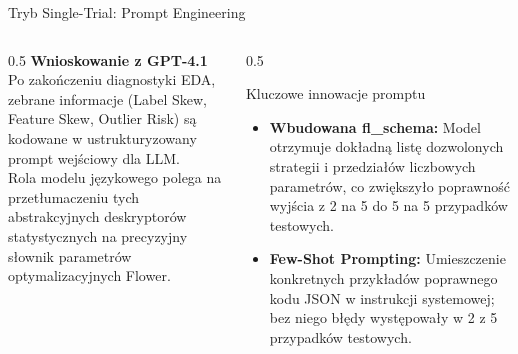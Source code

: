 \documentclass[9pt,aspectratio=169]{beamer}
\begin{document}
\begin{frame}{Tryb Single-Trial: Prompt Engineering}
\begin{columns}[T]
\begin{column}{0.5\textwidth}
\textbf{Wnioskowanie z GPT-4.1}\\[4pt]
Po zakończeniu diagnostyki EDA, zebrane informacje (Label Skew, Feature Skew, Outlier Risk) są kodowane w ustrukturyzowany prompt wejściowy dla LLM.\\[6pt]
Rola modelu językowego polega na przetłumaczeniu tych abstrakcyjnych deskryptorów statystycznych na precyzyjny słownik parametrów optymalizacyjnych Flower.
\end{column}
\begin{column}{0.5\textwidth}
\begin{infobox}{Kluczowe innowacje promptu}
\begin{itemize}\footnotesize
\item \textbf{Wbudowana fl\_schema:} Model otrzymuje dokładną listę dozwolonych strategii i przedziałów liczbowych parametrów, co zwiększyło poprawność wyjścia z 2 na 5 do 5 na 5 przypadków testowych.
\item \textbf{Few-Shot Prompting:} Umieszczenie konkretnych przykładów poprawnego kodu JSON w instrukcji systemowej; bez niego błędy występowały w 2 z 5 przypadków testowych.
\end{itemize}
\end{infobox}
\end{column}
\end{columns}
\end{frame}
\end{document}
